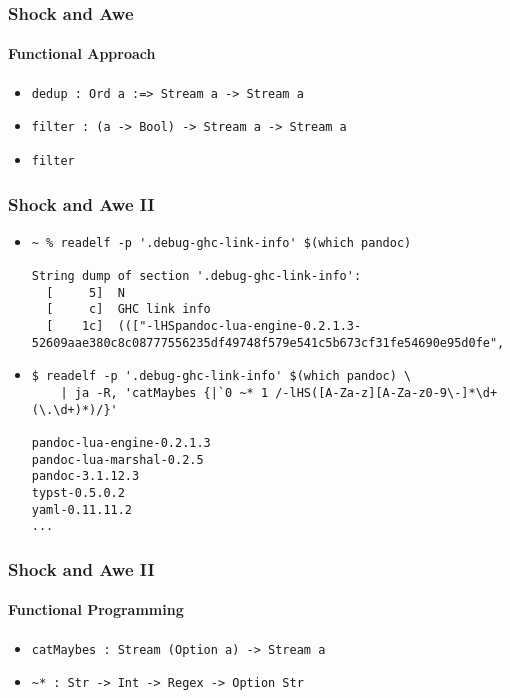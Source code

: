\documentclass{beamer}
\begin{document}
\begin{frame}[fragile]
  \frametitle{Shock and Awe}
  \framesubtitle{Functional Approach}
  \begin{itemize}
    \item \verb|dedup : Ord a :=> Stream a -> Stream a|
    \item \verb|filter : (a -> Bool) -> Stream a -> Stream a|
    \item \verb|filter| 
  \end{itemize}
\end{frame}

\begin{frame}[fragile]
  \frametitle{Shock and Awe II}
  \begin{itemize}
    \item
      \begin{verbatim}
~ % readelf -p '.debug-ghc-link-info' $(which pandoc)

String dump of section '.debug-ghc-link-info':
  [     5]  N
  [     c]  GHC link info
  [    1c]  ((["-lHSpandoc-lua-engine-0.2.1.3-52609aae380c8c08777556235df49748f579e541c5b673cf31fe54690e95d0fe",
      \end{verbatim}
    \item
      \begin{verbatim}
$ readelf -p '.debug-ghc-link-info' $(which pandoc) \
    | ja -R, 'catMaybes {|`0 ~* 1 /-lHS([A-Za-z][A-Za-z0-9\-]*\d+(\.\d+)*)/}'

pandoc-lua-engine-0.2.1.3
pandoc-lua-marshal-0.2.5
pandoc-3.1.12.3
typst-0.5.0.2
yaml-0.11.11.2
...
      \end{verbatim}
  \end{itemize}
\end{frame}

\begin{frame}[fragile]
  \frametitle{Shock and Awe II}
  \framesubtitle{Functional Programming}
  \begin{itemize}
    \item \verb|catMaybes : Stream (Option a) -> Stream a|
    \item \verb|~* : Str -> Int -> Regex -> Option Str|
  \end{itemize}
\end{frame}

\end{document}
